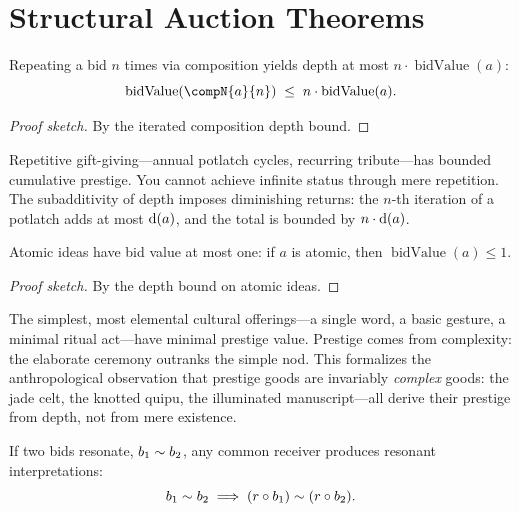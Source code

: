 \section{Structural Auction Theorems}
\label{sec:ch14-structural}

\begin{theorem}
\label{thm:iterated-bid}
Repeating a bid $n$ times via composition yields depth at most
$n \cdot \operatorname{bidValue}(a)$:
\[
  \operatorname{bidValue}(\compN{a}{n}) \;\le\; n \cdot \operatorname{bidValue}(a).
\]
\end{theorem}

\begin{proof}[Proof sketch]
By the iterated composition depth bound.
\end{proof}

Repetitive gift-giving---annual potlatch cycles, recurring tribute---has
bounded cumulative prestige.  You cannot achieve infinite status through mere
repetition.  The subadditivity of depth imposes diminishing returns:
the $n$-th iteration of a potlatch adds at most $\operatorname{d}(a)$, and the
total is bounded by $n \cdot \operatorname{d}(a)$.

\begin{theorem}
\label{thm:atomic-bid}
Atomic ideas have bid value at most one: if $a$ is atomic, then
$\operatorname{bidValue}(a) \le 1$.
\end{theorem}

\begin{proof}[Proof sketch]
By the depth bound on atomic ideas.
\end{proof}

The simplest, most elemental cultural offerings---a single word, a basic
gesture, a minimal ritual act---have minimal prestige value.  Prestige
comes from complexity: the elaborate ceremony outranks the simple nod.
This formalizes the anthropological observation that prestige goods are
invariably \emph{complex} goods: the jade celt, the knotted quipu, the
illuminated manuscript---all derive their prestige from depth, not from
mere existence.

\begin{theorem}
\label{thm:resonant-bids}
If two bids resonate, $b_1 \sim b_2$, any common receiver produces resonant
interpretations:
\[
  b_1 \sim b_2
  \;\Longrightarrow\;
  (r \circ b_1) \sim (r \circ b_2).
\]
\end{theorem}

